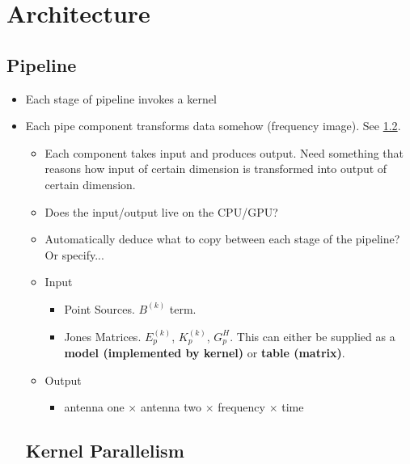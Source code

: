 \documentclass[]{article}
\begin{document}
\section{Architecture}

\subsection{Pipeline}

\begin{itemize}
\item Each stage of pipeline invokes a kernel
\item Each pipe component transforms data somehow (frequency image). See \ref{sec:kernel_parallelism}.
\begin{itemize}
\item Each component takes input and produces output. Need something that reasons how input of certain dimension is transformed into output of certain dimension.
\item Does the input/output live on the CPU/GPU?
\item Automatically deduce what to copy between each stage of the pipeline? Or specify...
\end{itemize}
\begin{itemize}
\item Input
\begin{itemize}
\item Point Sources. $B^{(k)}$ term.
\item Jones Matrices. $E_p^{(k)}$, $K_p^{(k)}$, $G_p^H$. This can either be supplied as a {\bf model (implemented by kernel)} or {\bf table (matrix)}.
\end{itemize}
\item Output
\begin{itemize}
\item antenna one $\times$ antenna two $\times$ frequency $\times$ time
\end{itemize}
\end{itemize}

\subsection{Kernel Parallelism}
\label{sec:kernel_parallelism}


\end{itemize}
\end{document}
